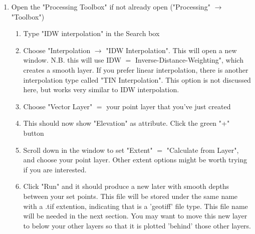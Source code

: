 \begin{enumerate}
\begin{enumerate}
        \item Repeat this for all points you want to include for interpolation of the 3D depth layer.
    \end{enumerate}
    \item Open the "Processing Toolbox" if not already open ("Processing" $\rightarrow$ "Toolbox")
    \begin{enumerate}
        \item Type "IDW interpolation" in the Search box
        \item Choose "Interpolation $\rightarrow$ "IDW Interpolation". This will open a new window. N.B. this will use IDW $=$ Inverse-Distance-Weighting", which creates a smooth layer. If you prefer linear interpolation, there is another interpolation type called "TIN Interpolation". This option is not discussed here, but works very similar to IDW interpolation. 
        \item Choose "Vector Layer" $=$ your point layer that you've just created
        \item This should now show "Elevation" as attribute. Click the green "+" button
        \item Scroll down in the window to set "Extent" $=$ "Calculate from Layer", and choose your point layer. Other extent options might be worth trying if you are interested.
        \item Click "Run" and it should produce a new later with smooth depths between your set points. This file will be stored under the same name with a .tif extention, indicating that is a 'geotiff' file type. This file name will be needed in the next section. You may want to move this new layer to below your other layers so that it is plotted 'behind' those other layers. 
    \end{enumerate}
\end{enumerate}

